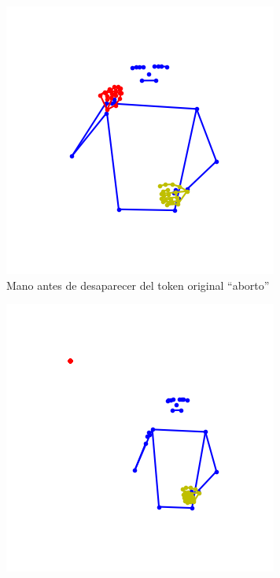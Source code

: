 \begin{figure}[t]
\centering
		\begin{subfigure}[t]{0.3\textwidth}
		\centering
		\includegraphics[align=t,width=0.9\linewidth, height =0.9\linewidth]{Graphics/mano_antes_desaparecer}
		\caption{Mano antes de desaparecer del token original ``aborto''}
		\label{f:no_mano_faltante_0}
	\end{subfigure}
	\hskip 0pt
	\begin{subfigure}[t]{0.3\textwidth}
		\centering
		\includegraphics[align=t,width=0.9\linewidth, height =0.9\linewidth]{Graphics/mano_desaparecida}

\end{subfigure}
\end{figure}
